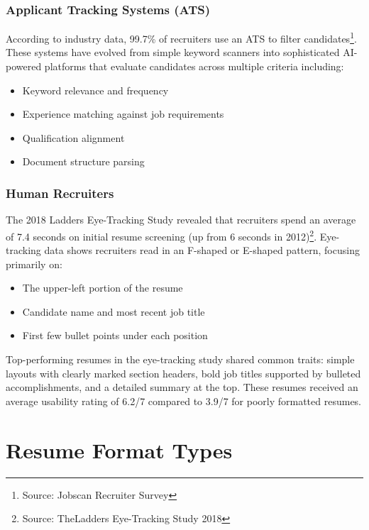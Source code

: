 \documentclass[11pt,a4paper]{article}
\begin{document}
\subsubsection{Applicant Tracking Systems (ATS)}

According to industry data, 99.7\% of recruiters use an ATS to filter candidates\footnote{Source: Jobscan Recruiter Survey}. These systems have evolved from simple keyword scanners into sophisticated AI-powered platforms that evaluate candidates across multiple criteria including:

\begin{itemize}
    \item Keyword relevance and frequency
    \item Experience matching against job requirements
    \item Qualification alignment
    \item Document structure parsing
\end{itemize}

\subsubsection{Human Recruiters}

The 2018 Ladders Eye-Tracking Study revealed that recruiters spend an average of 7.4 seconds on initial resume screening (up from 6 seconds in 2012)\footnote{Source: TheLadders Eye-Tracking Study 2018}. Eye-tracking data shows recruiters read in an F-shaped or E-shaped pattern, focusing primarily on:

\begin{itemize}
    \item The upper-left portion of the resume
    \item Candidate name and most recent job title
    \item First few bullet points under each position
\end{itemize}

\begin{bestpractice}
Top-performing resumes in the eye-tracking study shared common traits: simple layouts with clearly marked section headers, bold job titles supported by bulleted accomplishments, and a detailed summary at the top. These resumes received an average usability rating of 6.2/7 compared to 3.9/7 for poorly formatted resumes.
\end{bestpractice}

\section{Resume Format Types}
\end{document}
